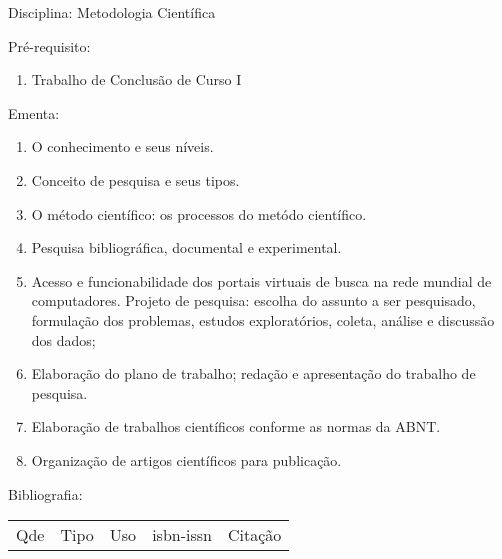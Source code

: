 \documentclass[12pt,a4paper,twoside]{report}
\begin{document}
Disciplina: Metodologia Científica

Pré-requisito:
\begin{enumerate}
\item Trabalho de Conclusão de Curso I
\end{enumerate}

Ementa:
\begin{enumerate}
\item O conhecimento e seus níveis.
\item Conceito de pesquisa e seus tipos.
\item O método científico: os processos do metódo científico.
\item Pesquisa bibliográfica, documental e experimental.
\item Acesso e funcionabilidade dos portais virtuais de busca na rede mundial de computadores. Projeto de pesquisa: escolha do assunto a ser pesquisado, formulação dos problemas, estudos exploratórios, coleta, análise e discussão dos dados;
\item Elaboração do plano de trabalho; redação e apresentação do trabalho de pesquisa.
\item Elaboração de trabalhos científicos conforme as normas da ABNT.
\item Organização de artigos científicos para publicação.
\end{enumerate}

Bibliografia:
\begin{tabular}{lllll}
Qde & Tipo & Uso & isbn-issn & Citação \\
\end{tabular}
\end{document}

